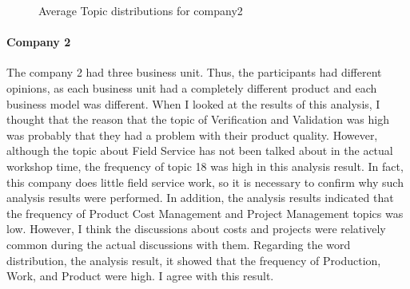 \documentclass[senior]{IPSstyle}
\begin{document}
\begin{figure}[h]
    \begin{center}
    \end{center}
\vspace{-0.3cm}
    \caption{Average Topic distributions for company2}
    \label{fig_c2}
    \vspace{-0.3cm}
\end{figure} 

\paragraph{Company 2} The company 2 had three business unit. Thus, the participants had different opinions, as each business unit had a completely different product and each business model was different. When I looked at the results of this analysis, I thought that the reason that the topic of Verification and Validation was high was probably that they had a problem with their product quality. However, although the topic about Field Service has not been talked about in the actual workshop time, the frequency of topic 18 was high in this analysis result. In fact, this company does little field service work, so it is necessary to confirm why such analysis results were performed. In addition, the analysis results indicated that the frequency of Product Cost Management and Project Management topics was low. However, I think the discussions about costs and projects were relatively common during the actual discussions with them. Regarding the word distribution, the analysis result, it showed that the frequency of Production, Work, and Product were high. I agree with this result.
\end{document}

